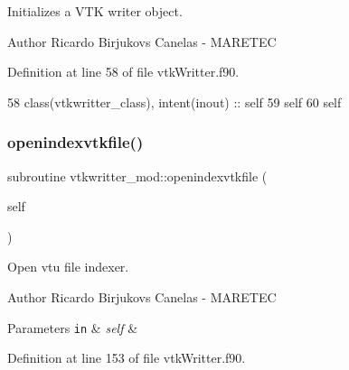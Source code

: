 Initializes a V\+TK writer object. 

\begin{DoxyAuthor}{Author}
Ricardo Birjukovs Canelas -\/ M\+A\+R\+E\+T\+EC 
\end{DoxyAuthor}


Definition at line 58 of file vtk\+Writter.\+f90.


\begin{DoxyCode}
58     \textcolor{keywordtype}{class}(vtkwritter\_class), \textcolor{keywordtype}{intent(inout)} :: self
59     self%
60     self%
\end{DoxyCode}
\mbox{\label{namespacevtkwritter__mod_a0c26bb22a8b7dd9f9da69309ad65d669}} 
\subsubsection{\texorpdfstring{openindexvtkfile()}{openindexvtkfile()}}
{\footnotesize\ttfamily subroutine vtkwritter\+\_\+mod\+::openindexvtkfile (\begin{DoxyParamCaption}\item[{class(\mbox{\hyperlink{structvtkwritter__mod_1_1vtkwritter__class}{vtkwritter\+\_\+class}}), intent(inout)}]{self }\end{DoxyParamCaption})\hspace{0.3cm}{\ttfamily [private]}}



Open vtu file indexer. 

\begin{DoxyAuthor}{Author}
Ricardo Birjukovs Canelas -\/ M\+A\+R\+E\+T\+EC 
\end{DoxyAuthor}

\begin{DoxyParams}[1]{Parameters}
\mbox{\tt in}  & {\em self} & \\
\hline
\end{DoxyParams}


Definition at line 153 of file vtk\+Writter.\+f90.


